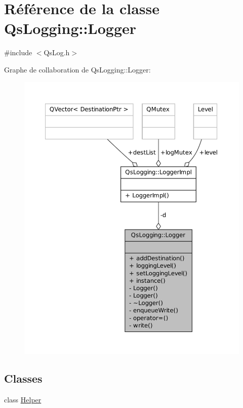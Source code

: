 \hypertarget{classQsLogging_1_1Logger}{\section{Référence de la classe Qs\-Logging\-:\-:Logger}
\label{classQsLogging_1_1Logger}
}


{\ttfamily \#include $<$Qs\-Log.\-h$>$}



Graphe de collaboration de Qs\-Logging\-:\-:Logger\-:
\nopagebreak
\begin{figure}[H]
\begin{center}
\leavevmode
\includegraphics[width=350pt]{classQsLogging_1_1Logger__coll__graph}
\end{center}
\end{figure}
\subsection*{Classes}
\begin{DoxyCompactItemize}
\item 
class \hyperlink{classQsLogging_1_1Logger_1_1Helper}{Helper}
\end{DoxyCompactItemize}
